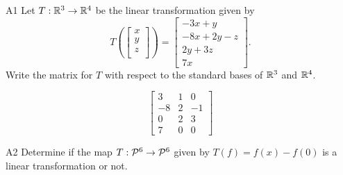 \documentclass{sbgLAsemi}
\begin{document}
\begin{problem}{A1}
Let $T: \IR^3\rightarrow \IR^4$ be the linear transformation given by $$T\left(\begin{bmatrix} x \\ y \\ z \\  \end{bmatrix} \right) = \begin{bmatrix} -3x+y \\ -8x+2y-z \\ 2y+3z \\ 7x \end{bmatrix}.$$  Write the matrix for $T$ with respect to the standard bases of $\IR^3$ and $\IR^4$.
\end{problem}
\begin{solution}
$$\begin{bmatrix} 3 & 1 & 0 \\ -8 & 2 & -1 \\ 0 & 2 & 3 \\ 7 & 0 & 0 \end{bmatrix}$$
\end{solution}

\begin{problem}{A2}
Determine if the map $T: \P^6  \rightarrow \P^6$ given by $T(f) = f(x)-f(0)$ is a linear transformation or not.
\end{problem}
\end{document}
